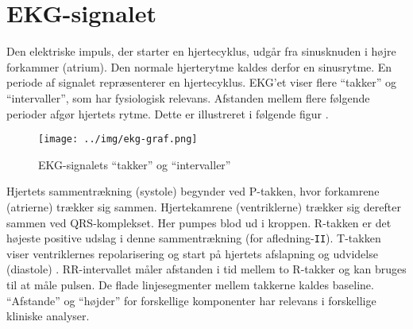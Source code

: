 \documentclass[a4paper]{report}
\begin{document}
\section{EKG-signalet}

        \begin{par}

Den elektriske impuls, der starter en hjertecyklus, udgår fra sinusknuden i højre forkammer (atrium).
Den normale hjerterytme kaldes derfor en sinusrytme.
En periode af signalet repræsenterer en hjertecyklus.
EKG'et viser flere ``takker'' og ``intervaller'', som har fysiologisk relevans.
Afstanden mellem flere følgende perioder afgør hjertets rytme.
Dette er illustreret i følgende figur \cite{realtimeecg}.
\begin{figure}[H]
\centering
\texttt{[image: ../img/ekg-graf.png]}
\caption{EKG-signalets ``takker'' og ``intervaller''\label{fig:signal}}
\end{figure}
Hjertets sammentrækning (systole) begynder ved P-takken, hvor forkamrene (atrierne) trækker sig sammen.
Hjertekamrene (ventriklerne) trækker sig derefter sammen ved QRS-komplekset.
Her pumpes blod ud i kroppen.
R-takken er det højeste positive udslag i denne sammentrækning (for afledning-\texttt{II}).
T-takken viser ventriklernes repolarisering og start på hjertets afslapning og udvidelse (diastole) \cite{absalon}.
RR-intervallet måler afstanden i tid mellem to R-takker og kan bruges til at måle pulsen.
De flade linjesegmenter mellem takkerne kaldes baseline.
``Afstande'' og ``højder'' for forskellige komponenter har relevans i forskellige kliniske analyser.

\end{par} 
\end{document}

